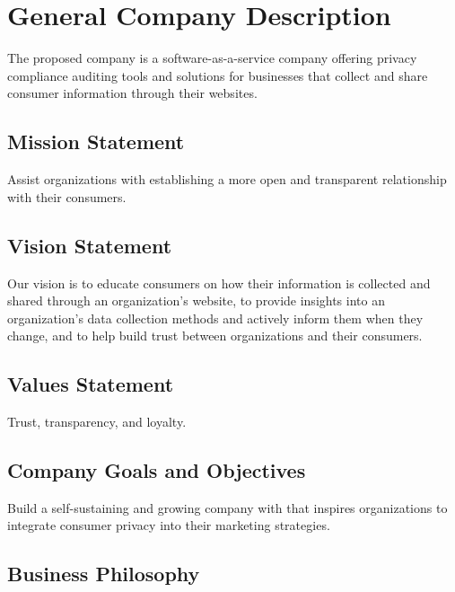 {\let\cleardoublepage\relax \chapter{General Company Description}}

The proposed company is a software-as-a-service company offering privacy compliance auditing tools and solutions for businesses that collect and share consumer information through their websites.

{\let\clearpage\relax \section{Mission Statement}}

Assist organizations with establishing a more open and transparent relationship with their consumers. 

\section{Vision Statement}

Our vision is to educate consumers on how their information is collected and shared through an organization's website, to provide insights into an organization's data collection methods and actively inform them when they change, and to help build trust between organizations and their consumers.

\section{Values Statement}

Trust, transparency, and loyalty.


\section{Company Goals and Objectives}

Build a self-sustaining and growing company with that inspires organizations to integrate consumer privacy into their marketing strategies.

\section{Business Philosophy}

